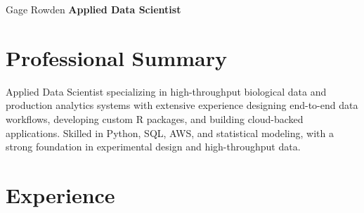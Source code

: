 \documentclass{resume}
\begin{document}
    \begin{header}

        \fontsize{25 pt}{25 pt}\selectfont Gage Rowden \textbf{Applied Data Scientist}\\
        \vspace{5 pt}
        \normalsize
        \mbox{}
        \AND
        \mbox{}
        \AND
        \mbox{}
        \AND
        \mbox{}
        \AND
        \mbox{}
    \end{header}

    \vspace{5 pt - 0.3 cm}

    \section{Professional Summary}
        \begin{centering}
        \Large{Applied Data Scientist specializing in high-throughput biological data and production analytics systems with extensive experience designing end-to-end data workflows, developing custom R packages, and building cloud-backed applications. Skilled in Python, SQL, AWS, and statistical modeling, with a strong foundation in experimental design and high-throughput data.}
        
        \end{centering}

    \section{Experience}
\end{document}
